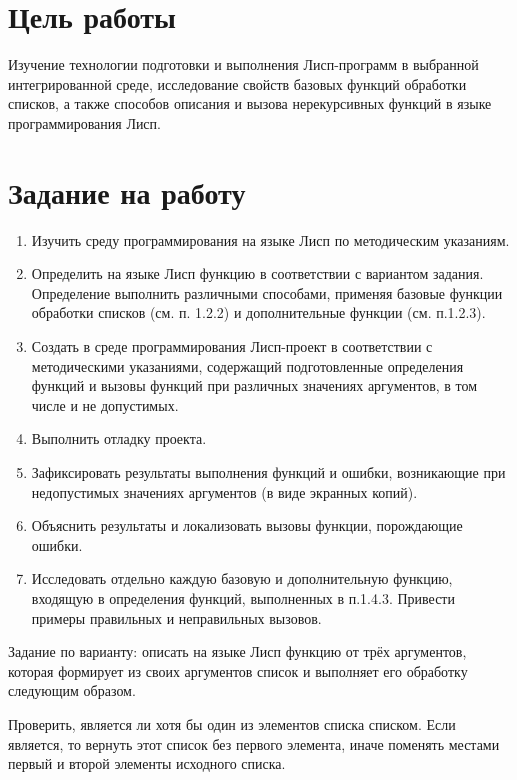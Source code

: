 \documentclass[a4paper,14pt]{extarticle}
\begin{document}


\section{Цель работы}
Изучение технологии подготовки и выполнения Лисп-программ в выбранной
интегрированной среде, исследование свойств базовых функций обработки списков, а
также способов описания и вызова нерекурсивных функций в языке программирования
Лисп.

\section{Задание на работу}
\begin{enumerate}
    \item Изучить среду программирования на языке Лисп по методическим
          указаниям.
    \item Определить на языке Лисп функцию в соответствии с вариантом задания.
          Определение выполнить различными способами, применяя базовые функции
          обработки списков (см. п. 1.2.2) и дополнительные функции (см. п.1.2.3).
    \item Создать в среде программирования Лисп-проект в соответствии с
          методическими указаниями, содержащий подготовленные определения функций
          и вызовы функций при различных значениях аргументов, в том числе и не
          допустимых.
    \item Выполнить отладку проекта.
    \item Зафиксировать результаты выполнения функций и ошибки, возникающие при
          недопустимых значениях аргументов (в виде экранных копий).
    \item Объяснить результаты и локализовать вызовы функции, порождающие ошибки.
    \item Исследовать отдельно каждую базовую и дополнительную функцию, входящую
          в определения функций, выполненных в п.1.4.3. Привести примеры правильных и
          неправильных вызовов.
\end{enumerate}

Задание по варианту: описать на языке Лисп функцию  от трёх аргументов,
которая формирует из своих аргументов список и выполняет его обработку следующим
образом.

Проверить, является ли хотя бы один из элементов списка списком. Если является,
то вернуть этот список без первого элемента, иначе поменять местами первый и
второй элементы исходного списка.
\end{document}
